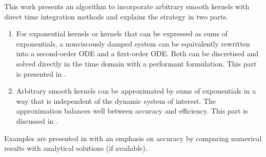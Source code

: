 This work presents an algorithm to incorporate arbitrary smooth kernels with direct time integration methods and explains the strategy in two parts.
\begin{enumerate}
\item For exponential kernels or kernels that can be expressed as sums of exponentials, a nonviscously damped system can be equivalently rewritten into a second-order ODE and a first-order ODE. Both can be discretised and solved directly in the time domain with a performant formulation. This part is presented in .
\item Arbitrary smooth kernels can be approximated by sums of exponentials in a way that is independent of the dynamic system of interest. The approximation balances well between accuracy and efficiency. This part is discussed in .
\end{enumerate}
Examples are presented in  with an emphasis on accuracy by comparing numerical results with analytical solutions (if available).
